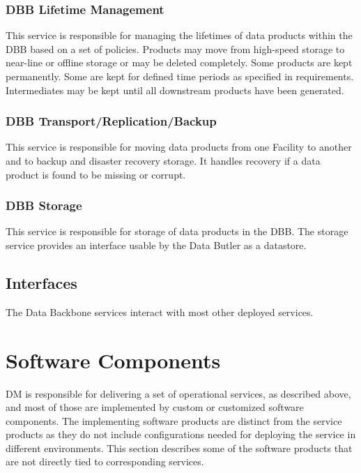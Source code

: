 \documentclass[DM,toc]{lsstdoc}
\begin{document}
\subsubsection{DBB Lifetime Management}\label{dbb-lifetime-metadata}

This service is responsible for managing the lifetimes of data products within the DBB based on a set of policies.
Products may move from high-speed storage to near-line or offline storage or may be deleted completely.
Some products are kept permanently.
Some are kept for defined time periods as specified in requirements.
Intermediates may be kept until all downstream products have been generated.

\subsubsection{DBB Transport/Replication/Backup}\label{dbb-transport-repl}

This service is responsible for moving data products from one Facility to another and to backup and disaster recovery storage.
It handles recovery if a data product is found to be missing or corrupt.

\subsubsection{DBB Storage}\label{dbb-storage}

This service is responsible for storage of data products in the DBB.
The storage service provides an interface usable by the Data Butler as a datastore.

\subsection{Interfaces}\label{backbone-interfaces}

The Data Backbone services interact with most other deployed services.


\section{Software Components}\label{software-components}

DM is responsible for delivering a set of operational services, as described above, and most of those are implemented by custom or customized software components.
The implementing software products are distinct from the service products as they do not include configurations needed for deploying the service in different environments.
This section describes some of the software products that are not directly tied to corresponding services.
\end{document}
